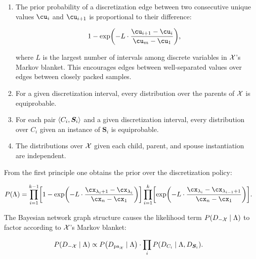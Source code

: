 \begin{enumerate}
\item The prior probability of a discretization edge between two consecutive unique values $\cu_i$ and $\cu_{i+1}$ is proportional to their difference:

  \begin{equation}
  1 - \exp \paren{- L \cdot \frac{\cu_{i+1} - \cu_i}{\cu_m - \cu_1}}\text{,}
  \end{equation}

where $L$ is the largest number of intervals among discrete variables in $\mathcal{X}$'s Markov blanket.
This encourages edges between well-separated values over edges between closely packed samples.

\item For a given discretization interval, every distribution over the parents of $\mathcal{X}$ is equiprobable.
\item For each pair $\langle C_i,\bm{S}_i \rangle$ and a given discretization interval, every distribution over $C_i$ given an instance of $\bm{S}_i$ is equiprobable.
\item The distributions over $\mathcal{X}$ given each child, parent, and spouse instantiation are independent.
\end{enumerate}

From the first principle one obtains the prior over the discretization policy:

\begin{small}
\begin{equation}
  \label{eq:p_M}
  P(\Lambda) = \prod_{i=1}^{k-1}
    \brock{
      1 - \exp\paren{
        - L \cdot \frac{
                         \cx_{\lambda_i +1} - \cx_{\lambda_i}
                       }{
                         \cx_n - \cx_1
                        }
      }
    }
    \prod_{i=1}^{k}
	\brock{
    \exp\paren{
      -L \cdot \frac{\cx_{\lambda_{i}} - \cx_{\lambda_{i-1} + 1}}{\cx_n - \cx_1}}
    }\text{.}
\end{equation}
\end{small}

The Bayesian network graph structure causes the likelihood term ${P(D_{-\mathcal{X}} \mid \Lambda)}$ to factor according to $\mathcal{X}$'s Markov blanket:

\begin{equation}
  \label{eq:p_D_given_M}
  P\paren{D_{-\cX} \mid \Lambda} \propto P\paren{D_{\Pa_\cX} \mid \Lambda} \cdot \prod_{i} P\paren{D_{C_i} \mid \Lambda, D_{\bm{S}_i}}\text{.}
\end{equation}

